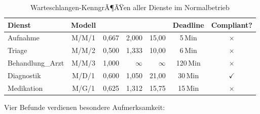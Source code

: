 ﻿\documentclass[a4paper,12pt]{scrreprt}
\theoremstyle{definition}
\begin{document}
\begin{table}[H]
	\centering
	\begin{tabular}{@{}lcrrrcc@{}}
		\toprule
		\textbf{Dienst} & \textbf{Modell} & \boldmath{$\rho$} &
		\boldmath{$L$} & \boldmath{$W$ (Min)} & \textbf{Deadline} & \textbf{Compliant?} \\
		\midrule
		Aufnahme        & M/M/1 & 0{,}667 & 2{,}000 &  15{,}00 & 5\,Min   & $\times$ \\
		Triage          & M/M/2 & 0{,}500 & 1{,}333 &  10{,}00 & 6\,Min   & $\times$ \\
		Behandlung\_Arzt& M/M/3 & 1{,}000 & $\infty$& $\infty$ & 120\,Min & $\times$ \\
		Diagnostik      & M/D/1 & 0{,}600 & 1{,}050 &  21{,}00 & 30\,Min  & $\checkmark$ \\
		Medikation      & M/G/1 & 0{,}625 & 1{,}312 &  15{,}75 & 15\,Min  & $\times$ \\
		\bottomrule
	\end{tabular}
	\caption{Warteschlangen-KenngrÃ¶ÃŸen aller Dienste im Normalbetrieb}
	\label{tab:wq-auswertung-normal}
\end{table}

Vier Befunde verdienen besondere Aufmerksamkeit:
\end{document}
